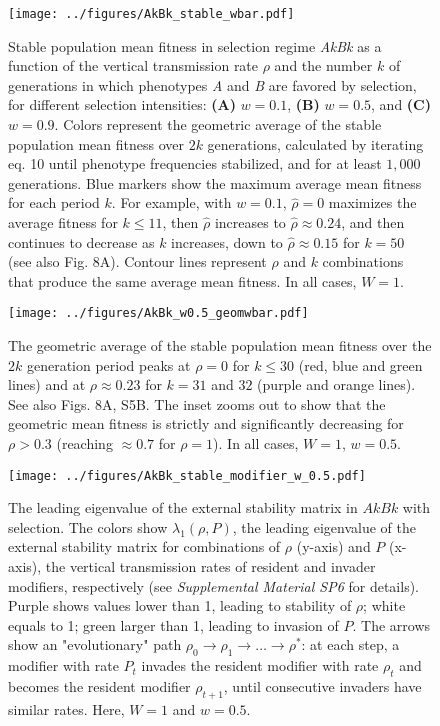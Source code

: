 \documentclass[]{article}
\begin{document}
\begin{figure}
\centering
\texttt{[image: ../figures/AkBk\_stable\_wbar.pdf]}
\caption{Stable population mean fitness in selection regime \emph{AkBk} as a function of the vertical transmission rate \(\rho\) and the number \(k\) of generations in which phenotypes \emph{A} and \emph{B} are favored by selection, for different selection intensities: \textbf{(A)} \(w=0.1\), \textbf{(B)} \(w=0.5\), and \textbf{(C)} \(w=0.9\).
Colors represent the geometric average of the stable population mean fitness over \(2k\) generations, calculated by iterating eq. 10 until phenotype frequencies stabilized, and for at least \(1,000 \) generations.
Blue markers show the maximum average mean fitness for each period \(k\).
For example, with \(w=0.1\), \(\hat{\rho}=0\) maximizes the average fitness for \(k \le 11\), then \(\hat{\rho}\) increases to \(\hat{\rho} \approx 0.24\), and then continues to decrease as \(k\) increases, down to \(\hat{\rho} \approx 0.15\) for \(k=50\) (see also Fig. 8A).
Contour lines represent \(\rho\) and \(k\) combinations that produce the same average mean fitness. 
In all cases, $W=1$.}\label{fig:AkBk_stable_wbar}
\end{figure}

\begin{figure}
\centering
\texttt{[image: ../figures/AkBk\_w0.5\_geomwbar.pdf]}
\caption{The geometric average of the stable population mean fitness over the $2k$ generation period peaks at $\rho=0$ for $k \le 30$ (red, blue and green lines) and at $\rho \approx 0.23$ for $k=31$ and $32$ (purple and orange lines). 
See also Figs. 8A, S5B. The inset zooms out to show that the geometric mean fitness is strictly and significantly decreasing for $\rho>0.3$ (reaching $\approx 0.7$ for $\rho=1$).
In all cases, $W=1$, $w=0.5$.}\label{fig:AkBk_w0.5_geomwbar}
\end{figure}

\begin{figure}
\centering
\texttt{[image: ../figures/AkBk\_stable\_modifier\_w\_0.5.pdf]}
 \caption{The leading eigenvalue of the external stability matrix in $AkBk$ with selection. The colors show $\lambda_1(\rho, P)$, the leading eigenvalue of the external stability matrix for combinations of $\rho$ (y-axis) and $P$ (x-axis), the vertical transmission rates of resident and invader modifiers, respectively (see \emph{Supplemental Material SP6} for details). Purple shows values lower than 1, leading to stability of $\rho$; white equals to 1; green larger than 1, leading to invasion of $P$.
  The arrows show an "evolutionary" path $\rho_{0} \to \rho_{1} \to \ldots \to \rho^*$: at each step, a modifier with rate $P_t$ invades the resident modifier with rate $\rho_t$ and becomes the resident modifier $\rho_{t+1}$, until consecutive invaders have similar rates.
  Here, $W=1$ and $w=0.5$.}\label{fig:AkBk_stable_modifier_w_0.5}
\end{figure}
\end{document}
